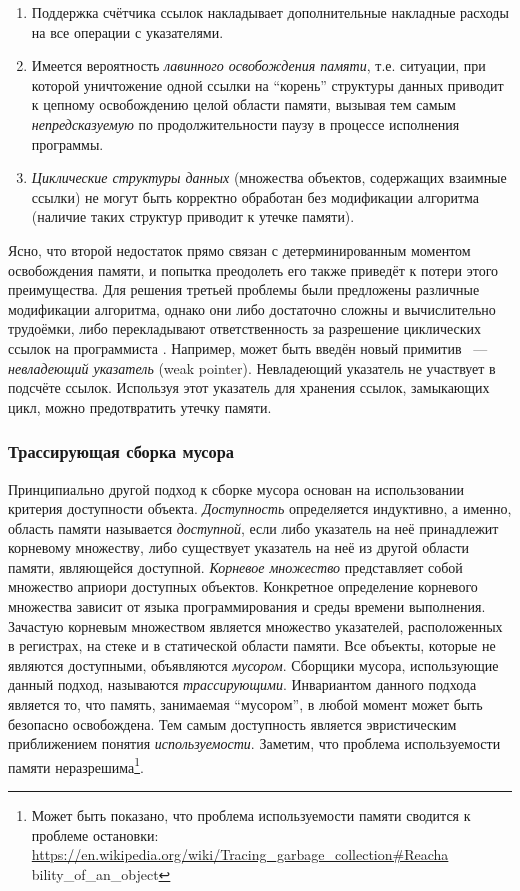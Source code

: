 \begin{enumerate}
\item 
	Поддержка счётчика ссылок накладывает дополнительные накладные расходы на все 
	операции с указателями.
\item 
	Имеется вероятность \emph{лавинного освобождения памяти}, т.е. ситуации, 
	при которой уничтожение одной ссылки на ``корень'' структуры данных приводит 
	к цепному освобождению целой области памяти, вызывая тем самым 
	\emph{непредсказуемую} по продолжительности паузу в процессе исполнения программы.
\item 
	\emph{Циклические структуры данных} (множества объектов, содержащих взаимные ссылки) 
	не могут быть корректно обработан без модификации алгоритма 
	(наличие таких структур приводит к утечке памяти).
\end{enumerate}

Ясно, что второй недостаток прямо связан с детерминированным моментом освобождения памяти, 
и попытка преодолеть его также приведёт к потери этого преимущества. 
Для решения третьей проблемы были предложены различные модификации алгоритма, 
однако они либо достаточно сложны и вычислительно трудоёмки, либо перекладывают 
ответственность за разрешение циклических ссылок на программиста \cite{book:jones1996garbage}. 
Например, может быть введён новый примитив ~---~ \emph{невладеющий указатель} (weak pointer). 
Невладеющий указатель не участвует в подсчёте ссылок. 
Используя этот указатель для хранения ссылок, замыкающих цикл, можно предотвратить 
утечку памяти.


\subsubsection{Трассирующая сборка мусора}

Принципиально другой подход к сборке мусора основан на использовании критерия 
доступности объекта. 
\emph{Доступность} определяется индуктивно, а именно, область памяти называется 
\emph{доступной}, если либо указатель на неё принадлежит корневому множеству, 
либо существует указатель на неё из другой области памяти, являющейся доступной. 
\emph{Корневое множество} представляет собой множество априори доступных объектов. 
Конкретное определение корневого множества зависит от языка программирования и среды 
времени выполнения. 
Зачастую корневым множеством является множество указателей, расположенных в регистрах, 
на стеке и в статической области памяти. 
Все объекты, которые не являются доступными, объявляются \emph{мусором}. 
Сборщики мусора, использующие данный подход, называются \emph{трассирующими}. 
Инвариантом данного подхода является то, что память, занимаемая ``мусором'', в любой 
момент может быть безопасно освобождена. 
Тем самым доступность является эвристическим приближением понятия \emph{используемости}. 
Заметим, что проблема используемости памяти неразрешима\footnote{Может быть показано, что 
проблема используемости памяти сводится к проблеме остановки: \\
\url{https://en.wikipedia.org/wiki/Tracing\_garbage\_collection\#Reacha}\\{bility\_of\_an\_object}}. 

